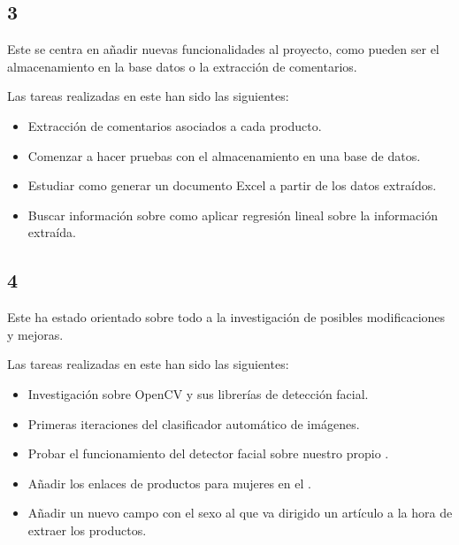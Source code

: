 \subsection{ 3} %
Este  se centra en añadir nuevas funcionalidades al proyecto, como pueden ser el almacenamiento en la base datos o la extracción de comentarios.


Las tareas realizadas en este  han sido las siguientes:
 
\begin{itemize}
    \item Extracción de comentarios asociados a cada producto.
    \item Comenzar a hacer pruebas con el almacenamiento en una base de datos.
    \item Estudiar como generar un documento Excel a partir de los datos extraídos.
    \item Buscar información sobre como aplicar regresión lineal sobre la información extraída.
\end{itemize}

\subsection{ 4} %
Este  ha estado orientado sobre todo a la investigación de posibles modificaciones y mejoras.


Las tareas realizadas en este  han sido las siguientes:
 
\begin{itemize}
    \item Investigación sobre OpenCV y sus librerías de detección facial.
    \item Primeras iteraciones del clasificador automático de imágenes.
    \item Probar el funcionamiento del detector facial sobre nuestro propio .
    \item Añadir los enlaces de productos para mujeres en el .
    \item Añadir un nuevo campo con el sexo al que va dirigido un artículo a la hora de extraer los productos.
\end{itemize}


